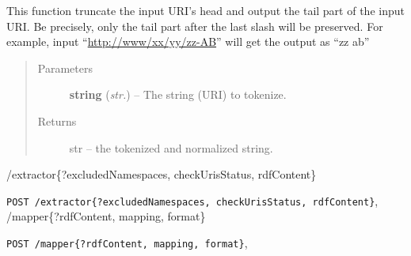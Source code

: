 \documentclass[letterpaper,10pt,english]{sphinxmanual}
\begin{document}
\begin{fulllineitems}

\begin{fulllineitems}
\label{api_ref:tokenizer.Tokenizer.tokenized_url}
This function truncate the input URI's head and 
output the tail part of the input URI. Be precisely, 
only the tail part after the last slash will be 
preserved. 
For example, 
input ``\href{http://www/xx/yy/zz-AB}{http://www/xx/yy/zz-AB}'' will get the 
output as ``zz ab''
\begin{quote}\begin{description}
\item[{Parameters}] \leavevmode
\textbf{string} (\emph{str.}) -- The string (URI) to tokenize.

\item[{Returns}] \leavevmode
str -- the tokenized and normalized string.

\end{description}\end{quote}

\end{fulllineitems}


\end{fulllineitems}



\renewcommand{\indexname}{HTTP Routing Table}
\begin{theindex}
\def\bigletter#1{{\Large\sffamily#1}\nopagebreak\vspace{1mm}}
\bigletter{/extractor\{?excludedNamespaces, checkUrisStatus, rdfContent\}}
\item {\texttt{POST /extractor\{?excludedNamespaces, checkUrisStatus, rdfContent\}}}, \pageref{user_guide:post--extractor_?excludedNamespaces, checkUrisStatus, rdfContent_}
\indexspace
\bigletter{/mapper\{?rdfContent, mapping, format\}}
\item {\texttt{POST /mapper\{?rdfContent, mapping, format\}}}, \pageref{user_guide:post--mapper_?rdfContent, mapping, format_}
\end{theindex}

\renewcommand{\indexname}{Index}
\printindex
\end{document}
